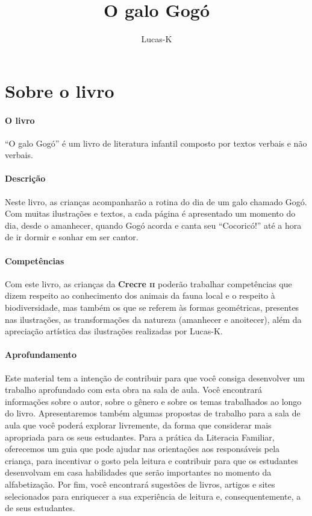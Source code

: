 \documentclass[11pt]{extarticle}
\newcommand{\AutorLivro}{Lucas-K}
\newcommand{\TituloLivro}{O galo Gogó}
\newcommand{\colaborador}{{Paulo Pompermaier e Renier Silva}}
\begin{document}
\title{\TituloLivro}
\author{\AutorLivro}
\def\authornotes{\colaborador}

\date{}
\maketitle


\tableofcontents



\section{Sobre o livro}

\paragraph{O livro} 
``O galo Gogó'' é um livro de literatura infantil composto por textos 
verbais e não verbais.
\paragraph{Descrição} 
Neste livro, as crianças acompanharão a rotina do dia de um galo chamado
Gogó. Com muitas ilustrações e textos, a cada página é
apresentado um momento do dia, desde o amanhecer, quando
Gogó acorda e canta seu ``Cocoricó!'' até a hora de ir dormir e sonhar
em ser cantor. 
\paragraph{Competências} 
Com este livro, as crianças da \textbf{Crecre \textsc{ii}} poderão
trabalhar competências que dizem respeito ao conhecimento dos
animais da fauna local e o respeito à biodiversidade, mas também
os que se referem às formas geométricas, presentes nas ilustrações,
as transformações da natureza (amanhecer e anoitecer), além da 
apreciação artística das ilustrações realizadas por Lucas-K.
\paragraph{Aprofundamento} 
Este material tem a intenção de contribuir para que você consiga desenvolver um trabalho aprofundado 
com esta obra na sala de aula. Você encontrará informações sobre o autor, sobre 
o gênero e sobre os temas trabalhados ao longo do livro. Apresentaremos também 
algumas propostas de trabalho para a sala de aula que você poderá explorar livremente, 
da forma que considerar mais apropriada para os seus estudantes. Para a prática 
da Literacia Familiar, oferecemos um guia que pode ajudar nas orientações aos 
responsáveis pela criança, para incentivar o gosto pela leitura e contribuir para 
que os estudantes desenvolvam em casa habilidades que serão importantes no momento 
da alfabetização. Por fim, você encontrará sugestões de livros, artigos e sites 
selecionados para enriquecer a sua experiência de leitura e, 
consequentemente, a de seus estudantes.
\end{document}
